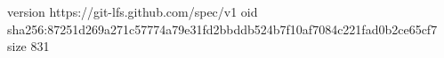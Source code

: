 version https://git-lfs.github.com/spec/v1
oid sha256:87251d269a271c57774a79e31fd2bbddb524b7f10af7084c221fad0b2ce65cf7
size 831
